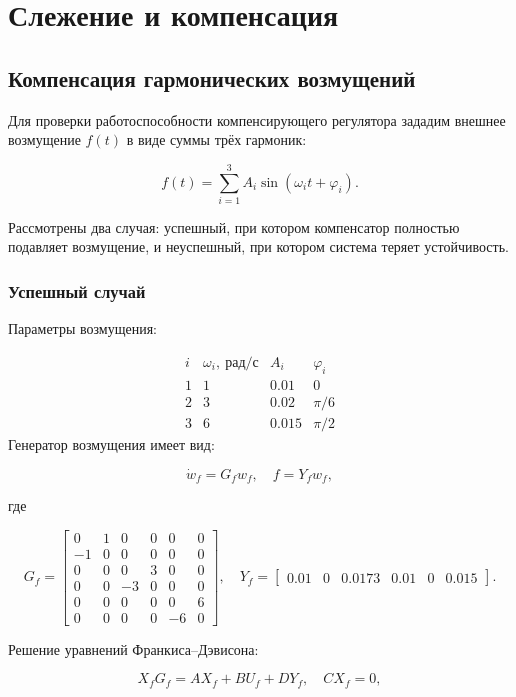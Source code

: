 \documentclass[a4paper,12pt]{article}
\begin{document}
	\newpage
\section{Слежение и компенсация}

\subsection{Компенсация гармонических возмущений}

Для проверки работоспособности компенсирующего регулятора зададим внешнее возмущение \(f(t)\) в виде суммы трёх гармоник:

\[
f(t) = \sum_{i=1}^{3} A_i \sin(\omega_i t + \varphi_i).
\]

Рассмотрены два случая: успешный, при котором компенсатор полностью подавляет возмущение, и неуспешный, при котором система теряет устойчивость.

\subsubsection{Успешный случай}

Параметры возмущения:

\[
\begin{array}{c|c|c|c}
	i & \omega_i,\ \text{рад/с} & A_i & \varphi_i \\ \hline
	1 & 1 & 0.01 & 0 \\
	2 & 3 & 0.02 & \pi/6 \\
	3 & 6 & 0.015 & \pi/2
\end{array}
\]
Генератор возмущения имеет вид:

\[
\dot{w}_f = G_f w_f, \quad f = Y_f w_f,
\]

где

\[
G_f = \begin{bmatrix}
	0 & 1 & 0 & 0 & 0 & 0 \\
	-1 & 0 & 0 & 0 & 0 & 0 \\
	0 & 0 & 0 & 3 & 0 & 0 \\
	0 & 0 & -3 & 0 & 0 & 0 \\
	0 & 0 & 0 & 0 & 0 & 6 \\
	0 & 0 & 0 & 0 & -6 & 0
\end{bmatrix},
\quad
Y_f = \begin{bmatrix}
	0.01 & 0 & 0.0173 & 0.01 & 0 & 0.015
\end{bmatrix}.
\]

Решение уравнений Франкиса–Дэвисона:

\[
X_f G_f = A X_f + B U_f + D Y_f, \quad C X_f = 0,
\]
\end{document}
